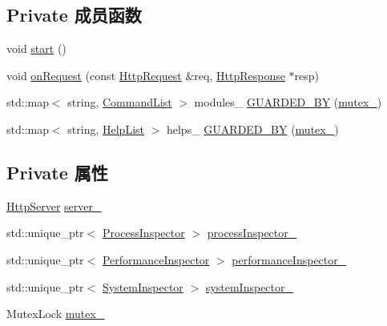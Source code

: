 \subsection*{Private 成员函数}
\begin{DoxyCompactItemize}
\item 
void \hyperlink{classmuduo_1_1net_1_1Inspector_a60de64d75454385b23995437f1d72669}{start} ()
\item 
void \hyperlink{classmuduo_1_1net_1_1Inspector_ab4136340ef5241a1d886a2fdb6a64f81}{on\+Request} (const \hyperlink{classmuduo_1_1net_1_1HttpRequest}{Http\+Request} \&req, \hyperlink{classmuduo_1_1net_1_1HttpResponse}{Http\+Response} $\ast$resp)
\item 
std\+::map$<$ string, \hyperlink{classmuduo_1_1net_1_1Inspector_a00ae736a47d9b5825c815a1c8aeeaeab}{Command\+List} $>$ modules\+\_\+ \hyperlink{classmuduo_1_1net_1_1Inspector_aedb5a31b0b75a5278a89c02d9e9e55d0}{G\+U\+A\+R\+D\+E\+D\+\_\+\+BY} (\hyperlink{classmuduo_1_1net_1_1Inspector_a6e1bf1809a42f40f1a21178dc6620a6f}{mutex\+\_\+})
\item 
std\+::map$<$ string, \hyperlink{classmuduo_1_1net_1_1Inspector_a45483c7152afba31eaf21e58681f619e}{Help\+List} $>$ helps\+\_\+ \hyperlink{classmuduo_1_1net_1_1Inspector_a2c36da39cb9d138e80cda07a07f57072}{G\+U\+A\+R\+D\+E\+D\+\_\+\+BY} (\hyperlink{classmuduo_1_1net_1_1Inspector_a6e1bf1809a42f40f1a21178dc6620a6f}{mutex\+\_\+})
\end{DoxyCompactItemize}
\subsection*{Private 属性}
\begin{DoxyCompactItemize}
\item 
\hyperlink{classmuduo_1_1net_1_1HttpServer}{Http\+Server} \hyperlink{classmuduo_1_1net_1_1Inspector_a8d24f403adf7c4ea3786080f597fa97a}{server\+\_\+}
\item 
std\+::unique\+\_\+ptr$<$ \hyperlink{classmuduo_1_1net_1_1ProcessInspector}{Process\+Inspector} $>$ \hyperlink{classmuduo_1_1net_1_1Inspector_afc3a071a43d239bd23e8b3ee3a36267e}{process\+Inspector\+\_\+}
\item 
std\+::unique\+\_\+ptr$<$ \hyperlink{classmuduo_1_1net_1_1PerformanceInspector}{Performance\+Inspector} $>$ \hyperlink{classmuduo_1_1net_1_1Inspector_a847b65dbf1b06feec2eb1c950e99086b}{performance\+Inspector\+\_\+}
\item 
std\+::unique\+\_\+ptr$<$ \hyperlink{classmuduo_1_1net_1_1SystemInspector}{System\+Inspector} $>$ \hyperlink{classmuduo_1_1net_1_1Inspector_a538656ca5a8c83dc0b19a638118d6d24}{system\+Inspector\+\_\+}
\item 
Mutex\+Lock \hyperlink{classmuduo_1_1net_1_1Inspector_a6e1bf1809a42f40f1a21178dc6620a6f}{mutex\+\_\+}
\end{DoxyCompactItemize}


